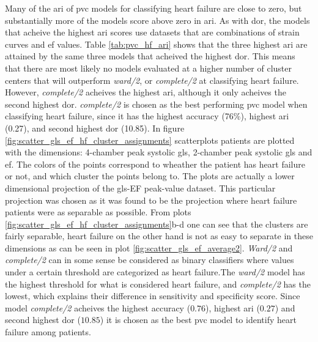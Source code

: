 \newpage

Many of the \acrshort{ari} of \acrshort{pvc} models for classifying heart failure are close to zero, but substantially more of the models score above zero in \acrshort{ari}. As with \acrshort{dor}, the models that acheive the highest \acrshort{ari} scores use datasets that are combinations of strain curves and \acrshort{ef} values. Table \ref{tab:pvc_hf_ari} shows that the three highest \acrshort{ari} are attained by the same three models that acheived the highest \acrshort{dor}. This means that there are most likely no models evaluated at a higher number of cluster centers that will outperform \textit{ward/2}, or \textit{complete/2} at classifying heart failure. However, \textit{complete/2} acheives the highest \acrshort{ari}, although it only acheives the second highest \acrshort{dor}. \textit{complete/2} is chosen as the best performing \acrshort{pvc} model when classifying heart failure, since it has the highest accuracy (76$\%$), highest \acrshort{ari} (0.27), and second highest \acrshort{dor} (10.85). In figure \ref{fig:scatter_gls_ef_hf_cluster_assignments} scatterplots patients are plotted with the dimensions: 4-chamber peak systolic \acrshort{gls}, 2-chamber peak systolic \acrshort{gls} and \acrshort{ef}. The colors of the points correspond to wheather the patient has heart failure or not, and which cluster the points belong to. The plots are actually a lower dimensional projection of the \acrshort{gls}-EF peak-value dataset. This particular projection was chosen as it was found to be the projection where heart failure patients were as separable as possible. From plots \ref{fig:scatter_gls_ef_hf_cluster_assignments}b-d one can see that the clusters are fairly separable, heart failure on the other hand is not as easy to separate in these dimensions as can be seen in plot \ref{fig:scatter_gls_ef_average2}. \textit{Ward/2} and \textit{complete/2} can in some sense be considered as binary classifiers where values under a certain threshold are categorized as heart failure.The \textit{ward/2} model has the highest threshold for what is considered heart failure, and \textit{complete/2} has the lowest, which explains their difference in sensitivity and specificity score. Since model \textit{complete/2} acheives the highest accuracy ($0.76$), highest \acrshort{ari} ($0.27$) and second highest \acrshort{dor} ($10.85$) it is chosen as the best \acrshort{pvc} model to identify heart failure among patients. \bigskip

